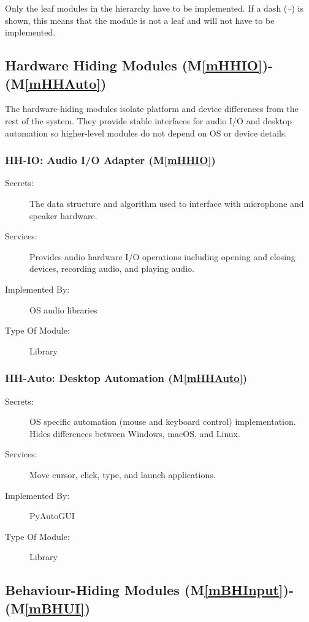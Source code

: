 \documentclass[12pt, titlepage]{article}
\newcommand{\mref}[1]{M\ref{#1}}
\begin{document}
Only the leaf modules in the hierarchy have to be implemented. If a dash
(\emph{--}) is shown, this means that the module is not a leaf and will not
have to be implemented.

\subsection{Hardware Hiding Modules (\mref{mHHIO})-(\mref{mHHAuto})}

The hardware-hiding modules isolate platform and device differences from the
rest of the system. They provide stable interfaces for audio I/O and desktop
automation so higher-level modules do not depend on OS or device details.

\subsubsection{HH-IO: Audio I/O Adapter (\mref{mHHIO})}
\begin{description}
\item[Secrets:] The data structure and algorithm used to interface with
microphone and speaker hardware.
\item[Services:] Provides audio hardware I/O operations including opening and
closing devices, recording audio, and playing audio.
\item[Implemented By:] OS audio libraries
\item[Type Of Module:] Library
\end{description}

\subsubsection{HH-Auto: Desktop Automation (\mref{mHHAuto})}
\begin{description}
\item[Secrets:] OS specific automation (mouse and keyboard control)
implementation. Hides differences between Windows, macOS, and Linux.
\item[Services:] Move cursor, click, type, and launch applications.
\item[Implemented By:] PyAutoGUI
\item[Type Of Module:] Library
\end{description}

\subsection{Behaviour-Hiding Modules (\mref{mBHInput})-(\mref{mBHUI})}
\end{document}
